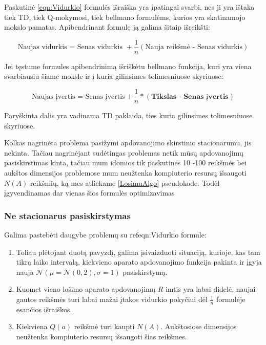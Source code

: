\documentclass[a4paper, 12pt]{article}
\begin{document}
Paskutinė \ref{eqn:Vidurkio} formulės išraiška yra įpatingai svarbi, nes ji yra ištaka tiek TD, tiek Q-mokymosi, tiek bellmano formulėms, kurios yra skatinamojo mokslo pamatas. Apibendrinant formulę ją galima šitaip išreikšti:

\begin{equation}
\text{Naujas vidurkis = Senas vidurkis }+ \frac{1}{n} (\text{Nauja reikšmė - Senas vidurkis})
\end{equation}

Jei tęstume formules apibendrinimą išriškėtu bellmano funkcija, kuri yra viena svarbiausiu šiame moksle ir į kuria gilinsimes tolimesniuose skyriuose:

\begin{equation}
\text{Naujas įvertis = Senas įvertis}+ \frac{1}{n} * (\textbf{Tikslas - Senas įvertis})
\end{equation}

Paryškinta dalis yra vadinama TD paklaida, ties kuria gilinsimes tolimesniuose skyriuose.

Kolkas nagrinėta problema pasižymi apdovanojimo skirstinio stacionarumu, jis nekinta. Tačiau nagrinėjant sudėtingas problemas netik mūsų apdovanojimų pasiskirstimas kinta, tačiau mum idomios tik paskutinės 10 -100 reikšmės bei aukštos dimensijos problemose mum neužtenka kompiuterio resursų išsaugoti $N(A)$ reikšmių, ką mes atliekame \ref{LosimuAlgo} pseudokode. Todėl įgyvendinamas dar vienas šios formulės optimizavimas

%
\subsubsection{Ne stacionarus pasiskirstymas}
%

Galima pastebėti daugybe problemų su ref{eqn:Vidurkio} formule:

\begin{enumerate}
  \addtolength{\itemsep}{-0.5\baselineskip} 
  \item Toliau plėtojant duotą pavyzdį, galima įsivaizduoti situaciją, kurioje, kas tam tikrą laiko intervalą, kiekvieno aparato apdovanojimo funkcija pakinta ir įgyja nauja $\mathcal{N}(\mu=\mathcal{N}(0,2),\sigma=1)$ pasiskirstymą.
  \item Kuomet vieno lošimo aparato apdovanojimų $R$ imtis yra labai didelė, naujai gautos reikšmės turi labai mažai įtakos vidurkio pokyčiui dėl $\frac{1}{n}$ formulėje esančios išraiškos.
  \item Kiekviena $Q(a)$ reikšmė turi kaupti $N(A)$. Aukštosiose dimensijos neužtenka kompiuterio resursų išsaugoti šias reikšmes.
\end{enumerate}
\end{document}

